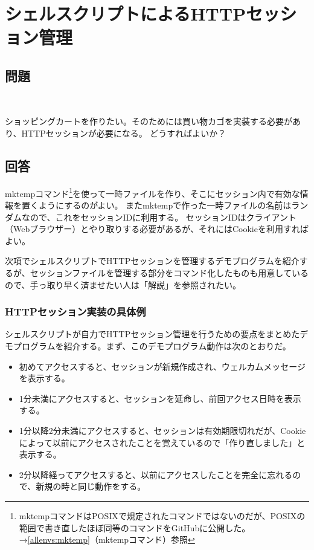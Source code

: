 \section{シェルスクリプトによるHTTPセッション管理}
\label{recipe:HTTP_session}

\subsection*{問題}
\noindent
$\!\!\!\!\!$
\begin{grshfboxit}{160.0mm}
	ショッピングカートを作りたい。そのためには買い物カゴを実装する必要があり、HTTPセッションが必要になる。
	どうすればよいか？
\end{grshfboxit}

\subsection*{回答}
mktempコマンド\footnote{mktempコマンドはPOSIXで規定されたコマンドではないのだが、POSIXの範囲で書き直したほぼ同等のコマンドをGitHubに公開した。→\ref{allenvs:mktemp}（mktempコマンド）参照}を使って一時ファイルを作り、そこにセッション内で有効な情報を置くようにするのがよい。
またmktempで作った一時ファイルの名前はランダムなので、これをセッションIDに利用する。
セッションIDはクライアント（Webブラウザー）とやり取りする必要があるが、それにはCookieを利用すればよい。

次項でシェルスクリプトでHTTPセッションを管理するデモプログラムを紹介するが、セッションファイルを管理する部分をコマンド化したものも用意しているので、手っ取り早く済ませたい人は「解説」を参照されたい。

\subsubsection*{HTTPセッション実装の具体例}

シェルスクリプトが自力でHTTPセッション管理を行うための要点をまとめたデモプログラムを紹介する。まず、このデモプログラム動作は次のとおりだ。
\begin{itemize}
  \item 初めてアクセスすると、セッションが新規作成され、ウェルカムメッセージを表示する。
  \item 1分未満にアクセスすると、セッションを延命し、前回アクセス日時を表示する。
  \item 1分以降2分未満にアクセスすると、セッションは有効期限切れだが、Cookieによって以前にアクセスされたことを覚えているので「作り直しました」と表示する。
  \item 2分以降経ってアクセスすると、以前にアクセスしたことを完全に忘れるので、新規の時と同じ動作をする。
\end{itemize}

